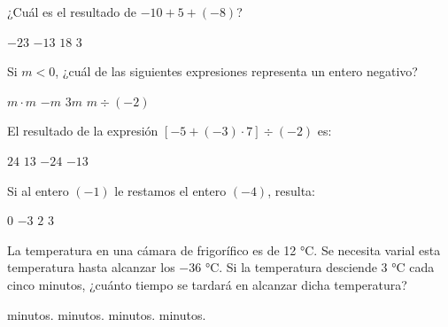 \documentclass[spanish,letterpaper, 12pt, addpoints, answers]{exam}
\begin{document}
\begin{questions}


    \question[1] ¿Cuál es el resultado de $-10+5+(-8)$?

    \begin{choices}
        \choice $-23$
        \CorrectChoice $-13$
        \choice $18$
        \choice $3$
    \end{choices}

    \vspace{0.15in}

    \question[1] Si $m<0$, ¿cuál de las siguientes expresiones representa un entero negativo?

    \begin{choices}
        \choice $m\cdot m$
        \choice $-m$
        \CorrectChoice $3m$
        \choice $m\div (-2)$
    \end{choices}

    \vspace{0.15in}


    \question[1] El resultado de la expresión $\left[-5+(-3)\cdot 7\right]\div (-2)$ es:
    \begin{choices}
        \choice $24$
        \CorrectChoice $13$
        \choice $-24$
        \choice $-13$
    \end{choices}

    \vspace{0.15in}

    \setlength{\multicolsep}{0.5em}
    \question[1] Si al entero $(-1)$ le restamos el entero $(-4)$, resulta:

    \begin{choices}
        \choice $0$
        \choice $-3$
        \choice $2$
        \CorrectChoice $3$
    \end{choices}
    \vspace{0.15in}

    \question[1] La temperatura en una cámara de frigorífico es de 12 °C. Se necesita varial esta temperatura hasta alcanzar los $-36$ °C. Si la temperatura desciende $3$ °C cada cinco minutos, ¿cuánto tiempo se tardará en alcanzar dicha temperatura?
    \begin{choices}
         minutos.
         minutos.
         minutos.
         minutos.
    \end{choices}
    \vspace{0.15in}


\end{questions}
\end{document}
